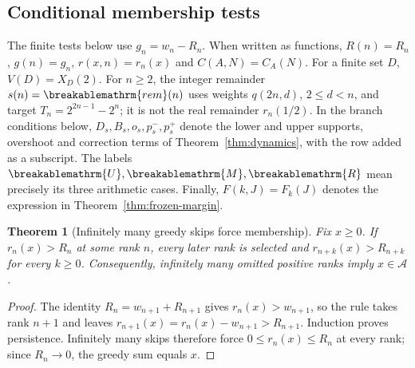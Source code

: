 \documentclass[11pt]{article}
\theoremstyle{plain}
\newtheorem{thm}{Theorem}[section]
\theoremstyle{definition}
\theoremstyle{remark}
\renewcommand{\mathrm}[1]{\ifmmode\breakablemathrm{#1}\else\textrm{#1}\fi}%
\begin{document}
\subsection{Conditional membership tests}

The finite tests below use $g_n=w_n-R_n$.  When written as functions,
$R(n)=R_n$, $g(n)=g_n$, $r(x,n)=r_n(x)$ and $C(A,N)=C_A(N)$.
For a finite set $D$, $V(D)=X_D(2)$.  For $n\ge2$, the integer remainder
$s(n)=\mathrm{rem}(n)$ uses weights $q(2n,d)$, $2\le d<n$, and
target $T_n=2^{2n-1}-2^n$; it is not the real remainder $r_n(1/2)$.
In the branch conditions below, $D_s,B_s,o_s,p_s^-,p_s^+$ denote the
lower and upper supports, overshoot and correction terms of
Theorem~\ref{thm:dynamics}, with the row added as a subscript.
The labels $\mathrm U,\mathrm M,\mathrm R$ mean precisely its three
arithmetic cases.  Finally, $F(k,J)=F_k(J)$ denotes the expression in
Theorem~\ref{thm:frozen-margin}.



\begin{thm}[Infinitely many greedy skips force membership]
\label{thm:fatal-absorbing}
Fix $x\ge0$.  If $r_n(x)>R_n$ at some rank $n$, every later
rank is selected and $r_{n+k}(x)>R_{n+k}$ for every $k\ge0$.
Consequently, infinitely many omitted positive ranks imply
$x\in\mathcal A$.
\end{thm}
\begin{proof}
The identity $R_n=w_{n+1}+R_{n+1}$ gives
$r_n(x)>w_{n+1}$, so the rule takes rank $n+1$ and leaves
$r_{n+1}(x)=r_n(x)-w_{n+1}>R_{n+1}$.  Induction proves persistence.
Infinitely many skips therefore force $0\le r_n(x)\le R_n$ at
every rank; since $R_n\to0$, the greedy sum equals $x$.
\end{proof}
\end{document}
